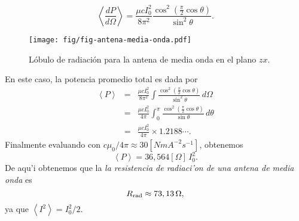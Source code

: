 \begin{equation}
 \left\langle\frac{dP}{d\Omega}\right\rangle=\frac{\mu c I_0^2}{8\pi^2}\frac{\cos^2\left(\frac{\pi}{2}\cos\theta\right)}{\sin^2\theta}.
\end{equation}
%
\begin{figure}[H]
\centerline{\texttt{[image: fig/fig-antena-media-onda.pdf]}}
 \caption{L\'obulo de radiaci\'on para la antena de media onda en el plano $zx$.}
\label{fig:lobulo_antena}
\end{figure}


En este caso, la potencia promedio total es dada por
\begin{eqnarray}
 \left\langle P\right\rangle
&=&\frac{\mu c I_0^2}{8\pi^2}\int\frac{\cos^2\left(\frac{\pi}{2}\cos\theta\right)}{\sin^2\theta}\,d\Omega \\
&=&\frac{\mu c I_0^2}{4\pi}\int_0^\pi\frac{\cos^2\left(\frac{\pi}{2}\cos\theta\right)}{\sin\theta}\,d\theta\\
&=&\frac{\mu c I_0^2}{4\pi}\times 1.2188\cdots .
\end{eqnarray}
Finalmente evaluando con $c\mu_0/4\pi\approx 30 [NmA^{-2}s^{-1}]$, obtenemos
\begin{equation}
 \left\langle P\right\rangle
=36,564[\Omega]\,I_0^2.
\end{equation}
De aqu'i obtenemos que la \textit{la resistencia de radiaci'on de una antena de media onda} es
\begin{equation}
 R_{\rm rad}\approx 73,13\,\Omega,
\end{equation}
ya que $\left\langle I^2\right\rangle=I_0^2/2$.